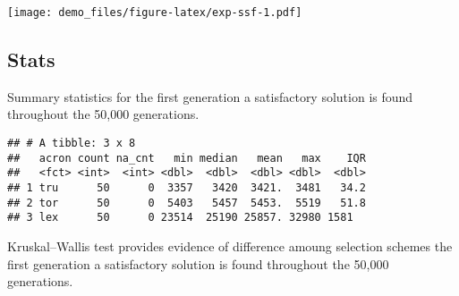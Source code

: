 \documentclass[]{book}
\newenvironment{Shaded}{\begin{snugshade}}{\end{snugshade}}
\newcommand{\DataTypeTok}[1]{\textcolor[rgb]{0.13,0.29,0.53}{#1}}
\newcommand{\KeywordTok}[1]{\textcolor[rgb]{0.13,0.29,0.53}{\textbf{#1}}}
\newcommand{\NormalTok}[1]{#1}
\newcommand{\OperatorTok}[1]{\textcolor[rgb]{0.81,0.36,0.00}{\textbf{#1}}}
\newcommand{\OtherTok}[1]{\textcolor[rgb]{0.56,0.35,0.01}{#1}}
\newcommand{\StringTok}[1]{\textcolor[rgb]{0.31,0.60,0.02}{#1}}
\begin{document}
\texttt{[image: demo\_files/figure-latex/exp-ssf-1.pdf]}

\hypertarget{stats-1}{%
\subsection{Stats}\label{stats-1}}

Summary statistics for the first generation a satisfactory solution is found throughout the 50,000 generations.

\begin{Shaded}
\end{Shaded}

\begin{verbatim}
## # A tibble: 3 x 8
##   acron count na_cnt   min median   mean   max    IQR
##   <fct> <int>  <int> <dbl>  <dbl>  <dbl> <dbl>  <dbl>
## 1 tru      50      0  3357   3420  3421.  3481   34.2
## 2 tor      50      0  5403   5457  5453.  5519   51.8
## 3 lex      50      0 23514  25190 25857. 32980 1581
\end{verbatim}

Kruskal--Wallis test provides evidence of difference amoung selection schemes the first generation a satisfactory solution is found throughout the 50,000 generations.
\end{document}
